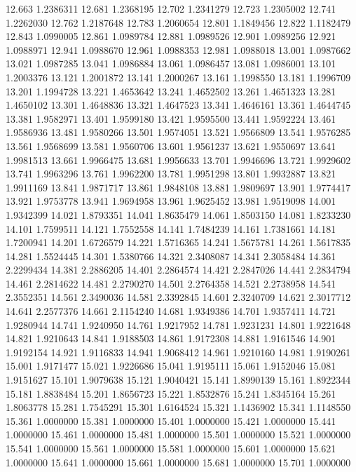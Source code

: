 12.663 1.2386311
12.681 1.2368195
12.702 1.2341279
12.723 1.2305002
12.741 1.2262030
12.762 1.2187648
12.783 1.2060654
12.801 1.1849456
12.822 1.1182479
12.843 1.0990005
12.861 1.0989784
12.881 1.0989526
12.901 1.0989256
12.921 1.0988971
12.941 1.0988670
12.961 1.0988353
12.981 1.0988018
13.001 1.0987662
13.021 1.0987285
13.041 1.0986884
13.061 1.0986457
13.081 1.0986001
13.101 1.2003376
13.121 1.2001872
13.141 1.2000267
13.161 1.1998550
13.181 1.1996709
13.201 1.1994728
13.221 1.4653642
13.241 1.4652502
13.261 1.4651323
13.281 1.4650102
13.301 1.4648836
13.321 1.4647523
13.341 1.4646161
13.361 1.4644745
13.381 1.9582971
13.401 1.9599180
13.421 1.9595500
13.441 1.9592224
13.461 1.9586936
13.481 1.9580266
13.501 1.9574051
13.521 1.9566809
13.541 1.9576285
13.561 1.9568699
13.581 1.9560706
13.601 1.9561237
13.621 1.9550697
13.641 1.9981513
13.661 1.9966475
13.681 1.9956633
13.701 1.9946696
13.721 1.9929602
13.741 1.9963296
13.761 1.9962200
13.781 1.9951298
13.801 1.9932887
13.821 1.9911169
13.841 1.9871717
13.861 1.9848108
13.881 1.9809697
13.901 1.9774417
13.921 1.9753778
13.941 1.9694958
13.961 1.9625452
13.981 1.9519098
14.001 1.9342399
14.021 1.8793351
14.041 1.8635479
14.061 1.8503150
14.081 1.8233230
14.101 1.7599511
14.121 1.7552558
14.141 1.7484239
14.161 1.7381661
14.181 1.7200941
14.201 1.6726579
14.221 1.5716365
14.241 1.5675781
14.261 1.5617835
14.281 1.5524445
14.301 1.5380766
14.321 2.3408087
14.341 2.3058484
14.361 2.2299434
14.381 2.2886205
14.401 2.2864574
14.421 2.2847026
14.441 2.2834794
14.461 2.2814622
14.481 2.2790270
14.501 2.2764358
14.521 2.2738958
14.541 2.3552351
14.561 2.3490036
14.581 2.3392845
14.601 2.3240709
14.621 2.3017712
14.641 2.2577376
14.661 2.1154240
14.681 1.9349386
14.701 1.9357411
14.721 1.9280944
14.741 1.9240950
14.761 1.9217952
14.781 1.9231231
14.801 1.9221648
14.821 1.9210643
14.841 1.9188503
14.861 1.9172308
14.881 1.9161546
14.901 1.9192154
14.921 1.9116833
14.941 1.9068412
14.961 1.9210160
14.981 1.9190261
15.001 1.9171477
15.021 1.9226686
15.041 1.9195111
15.061 1.9152046
15.081 1.9151627
15.101 1.9079638
15.121 1.9040421
15.141 1.8990139
15.161 1.8922344
15.181 1.8838484
15.201 1.8656723
15.221 1.8532876
15.241 1.8345164
15.261 1.8063778
15.281 1.7545291
15.301 1.6164524
15.321 1.1436902
15.341 1.1148550
15.361 1.0000000
15.381 1.0000000
15.401 1.0000000
15.421 1.0000000
15.441 1.0000000
15.461 1.0000000
15.481 1.0000000
15.501 1.0000000
15.521 1.0000000
15.541 1.0000000
15.561 1.0000000
15.581 1.0000000
15.601 1.0000000
15.621 1.0000000
15.641 1.0000000
15.661 1.0000000
15.681 1.0000000
15.701 1.0000000
